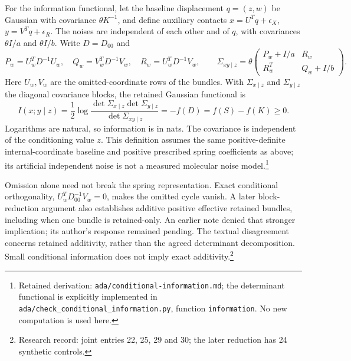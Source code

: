 \documentclass{article}
\begin{document}
For the information functional, let the baseline displacement \(q=(z,w)\) be Gaussian with covariance \(\theta K^{-1}\), and define auxiliary contacts \(x=U^Tq+\epsilon_X\), \(y=V^Tq+\epsilon_R\). The noises are independent of each other and of \(q\), with covariances \(\theta I/a\) and \(\theta I/b\). Write \(D=D_{00}\) and
\[
 P_w=U_w^TD^{-1}U_w,\quad Q_w=V_w^TD^{-1}V_w,\quad R_w=U_w^TD^{-1}V_w,
 \qquad
 \Sigma_{xy\mid z}=\theta\begin{pmatrix}P_w+I/a&R_w\\R_w^T&Q_w+I/b\end{pmatrix}.
\]
Here \(U_w,V_w\) are the omitted-coordinate rows of the bundles. With \(\Sigma_{x\mid z}\) and \(\Sigma_{y\mid z}\) the diagonal covariance blocks, the retained Gaussian functional is
\[
 I(x;y\mid z)=\frac12\log\frac{\det\Sigma_{x\mid z}\det\Sigma_{y\mid z}}
 {\det\Sigma_{xy\mid z}}=-f(D)=f(S)-f(K)\ge0.
\]
Logarithms are natural, so information is in nats. The covariance is independent of the conditioning value \(z\). This definition assumes the same positive-definite internal-coordinate baseline and positive prescribed spring coefficients as above; its artificial independent noise is not a measured molecular noise model.\footnote{Retained derivation: \texttt{ada/conditional-information.md}; the determinant functional is explicitly implemented in \texttt{ada/check\_conditional\_information.py}, function \texttt{information}. No new computation is used here.}

Omission alone need not break the spring representation. Exact conditional orthogonality, \(U_w^TD_{00}^{-1}V_w=0\), makes the omitted cycle vanish. A later block-reduction argument also establishes additive positive effective retained bundles, including when one bundle is retained-only. An earlier note denied that stronger implication; its author's response remained pending. The textual disagreement concerns retained additivity, rather than the agreed determinant decomposition. Small conditional information does not imply exact additivity.\footnote{Research record: joint entries 22, 25, 29 and 30; the later reduction has 24 synthetic controls.}
\end{document}

